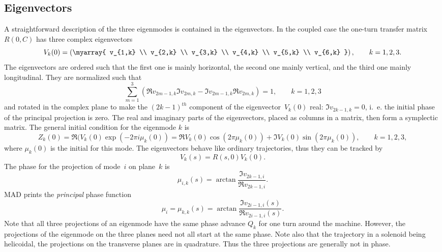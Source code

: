 \subsection{Eigenvectors}
\label{EMEVGO}
A straightforward description of the three eigenmodes is contained in
the eigenvectors.
In the coupled case the one-turn transfer matrix $R(0,C)$ has three
complex eigenvectors
\[
V_k(0) = \left( \myarray{
v_{1,k} \\ v_{2,k} \\ v_{3,k} \\ v_{4,k} \\ v_{5,k} \\ v_{6,k}
} \right), \qquad k = 1, 2, 3.
\]
The eigenvectors are ordered such that the first one is mainly
horizontal, the second one mainly vertical, and the third one mainly
longitudinal.
They are normalized such that
\[
\sum_{m=1}^3 (\Re v_{2m-1,k} \Im v_{2m,k} - \Im v_{2m-1,k} \Re v_{2m,k}) = 1,
\qquad k = 1, 2, 3
\]
and rotated in the complex plane to make the $(2k-1)^{th}$ component
of the eigenvector~$V_k(0)$ real: $\Im v_{2k-1,k} = 0$,
i.~e. the initial phase of the principal projection is zero.
The real and imaginary parts of the eigenvectors, placed as columns in
a matrix, then form a symplectic matrix.
The general initial condition for the eigenmode $k$ is
\[
Z_k(0) = \Re ( V_k(0) \exp (- 2 \pi i \mu_k(0)) =
\Re V_k(0) \cos (2 \pi \mu_k(0)) + \Im V_k(0) \sin (2 \pi \mu_k(0)),
\qquad k = 1, 2, 3,
\]
where $\mu_k(0)$ is the initial  for this mode.
The eigenvectors behave like ordinary trajectories,
thus they can be tracked by
\[
V_k(s) = R(s,0) V_k(0).
\]
The phase for the projection of mode~$i$ on plane~$k$ is
\[
\mu_{i,k}(s) = \arctan \frac{\Im v_{2k-1,i}}{\Re v_{2k-1,i}}.
\]
MAD prints the {\em principal} phase function
\[
\mu_{i} = \mu_{k,k}(s) =
\arctan \frac{\Im v_{2i-1,i}(s)}{\Re v_{2i-1,i}(s)}.
\]
Note that all three projections of an eigenmode have the same phase
advance $Q_k$ for one turn around the machine.
However, the projections of the eigenmode on the three planes need not
all start at the same phase.
Note also that the trajectory in a solenoid being helicoidal,
the projections on the transverse planes are in quadrature.
Thus the three projections are generally not in phase.

